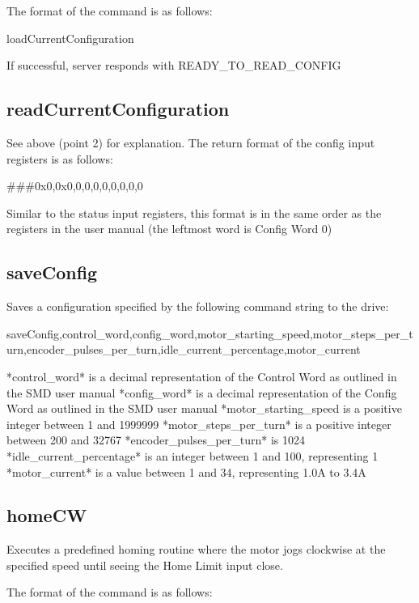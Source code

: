 The format of the command is as follows\+:

{\ttfamily load\+Current\+Configuration}

If successful, server responds with {\ttfamily R\+E\+A\+D\+Y\+\_\+\+T\+O\+\_\+\+R\+E\+A\+D\+\_\+\+C\+O\+N\+F\+I\+G}\hypertarget{index_readCurrentConfiguration}{}\subsection{read\+Current\+Configuration}\label{index_readCurrentConfiguration}
See above (point 2) for explanation. The return format of the config input registers is as follows\+:

{\ttfamily \#\#\#0x0,0x0,0,0,0,0,0,0,0,0}

Similar to the status input registers, this format is in the same order as the registers in the user manual (the leftmost word is Config Word 0)\hypertarget{index_saveConfig}{}\subsection{save\+Config}\label{index_saveConfig}
Saves a configuration specified by the following command string to the drive\+:

{\ttfamily save\+Config,control\+\_\+word,config\+\_\+word,motor\+\_\+starting\+\_\+speed,motor\+\_\+steps\+\_\+per\+\_\+turn,encoder\+\_\+pulses\+\_\+per\+\_\+turn,idle\+\_\+current\+\_\+percentage,motor\+\_\+current} \begin{DoxyVerb}*control_word* is a decimal representation of the Control Word as outlined in the SMD user manual
*config_word* is a decimal representation of the Config Word as outlined in the SMD user manual
*motor_starting_speed is a positive integer between 1 and 1999999
*motor_steps_per_turn* is a positive integer between 200 and 32767
*encoder_pulses_per_turn* is 1024
*idle_current_percentage* is an integer between 1 and 100, representing 1%
*motor_current* is a value between 1 and 34, representing 1.0A to 3.4A
\end{DoxyVerb}
\hypertarget{index_homeCW}{}\subsection{home\+C\+W}\label{index_homeCW}
Executes a predefined homing routine where the motor jogs clockwise at the specified speed until seeing the Home Limit input close.

The format of the command is as follows\+:

